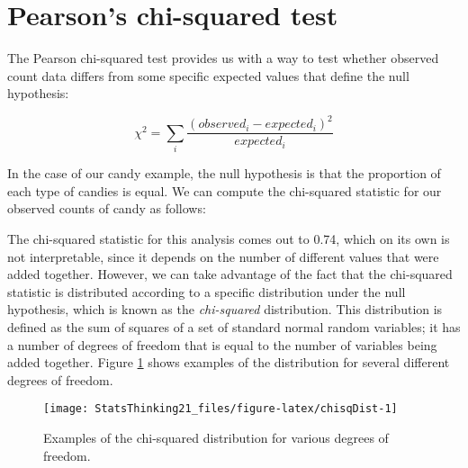 \documentclass[]{book}
\newenvironment{Shaded}{\begin{snugshade}}{\end{snugshade}}
\newcommand{\KeywordTok}[1]{\textcolor[rgb]{0.13,0.29,0.53}{\textbf{#1}}}
\newcommand{\DecValTok}[1]{\textcolor[rgb]{0.00,0.00,0.81}{#1}}
\newcommand{\StringTok}[1]{\textcolor[rgb]{0.31,0.60,0.02}{#1}}
\newcommand{\CommentTok}[1]{\textcolor[rgb]{0.56,0.35,0.01}{\textit{#1}}}
\newcommand{\OperatorTok}[1]{\textcolor[rgb]{0.81,0.36,0.00}{\textbf{#1}}}
\newcommand{\NormalTok}[1]{#1}
\theoremstyle{definition}
\theoremstyle{definition}
\theoremstyle{definition}
\theoremstyle{remark}
\begin{document}
\section{Pearson's chi-squared test}\label{pearsons-chi-squared-test}

The Pearson chi-squared test provides us with a way to test whether
observed count data differs from some specific expected values that
define the null hypothesis:

\[
\chi^2 = \sum_i\frac{(observed_i - expected_i)^2}{expected_i}
\]

In the case of our candy example, the null hypothesis is that the
proportion of each type of candies is equal. We can compute the
chi-squared statistic for our observed counts of candy as follows:

\begin{Shaded}
\end{Shaded}

The chi-squared statistic for this analysis comes out to 0.74, which on
its own is not interpretable, since it depends on the number of
different values that were added together. However, we can take
advantage of the fact that the chi-squared statistic is distributed
according to a specific distribution under the null hypothesis, which is
known as the \emph{chi-squared} distribution. This distribution is
defined as the sum of squares of a set of standard normal random
variables; it has a number of degrees of freedom that is equal to the
number of variables being added together. Figure \ref{fig:chisqDist}
shows examples of the distribution for several different degrees of
freedom.

\begin{figure}
\texttt{[image: StatsThinking21\_files/figure-latex/chisqDist-1]} \caption{Examples of the chi-squared distribution for various degrees of freedom.}\label{fig:chisqDist}
\end{figure}
\end{document}

